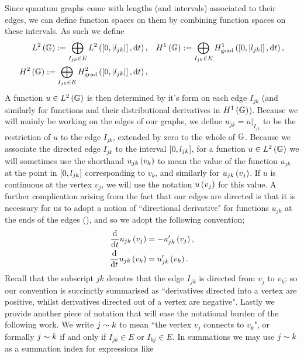 Since quantum graphs come with lengths (and intervals) associated to their edges, we can define function spaces on them by combining function spaces on these intervals.
As such we define
\begin{subequations} \label{eq:GraphFuncSpaces}
	\begin{align}
		L^2\left( \mathbb{G} \right) := \bigoplus_{I_{jk}\in E} L^{2}\left( \left[ 0,\left\lvert l_{jk} \right\rvert \right],\mathrm{d}t \right),
		&\quad H^1\left( \mathbb{G} \right) := \bigoplus_{I_{jk}\in E} H^1_\mathrm{grad}\left( \left[ 0,\left\lvert l_{jk} \right\rvert \right], \mathrm{d}t \right), \\
		H^2\left( \mathbb{G} \right) := \bigoplus_{I_{jk}\in E} H^2_\mathrm{grad}\left( \left[ 0,\left\lvert l_{jk} \right\rvert \right], \mathrm{d} t \right), &
	\end{align}
\end{subequations}
A function $u\in L^2\left( \mathbb{G} \right)$ is then determined by it's form on each edge $I_{jk}$ (and similarly for functions and their distributional derivatives in $H^1\left( \mathbb{G} \right)$).
Because we will mainly be working on the edges of our graphs, we define $u_{jk} = u\vert_{I_{jk}}$ to be the restriction of $u$ to the edge $I_{jk}$, extended by zero to the whole of $\mathbb{G}$.
Because we associate the directed edge $I_{jk}$ to the interval $\left[ 0,l_{jk} \right]$, for a function $u\in L^2\left( \mathbb{G} \right)$ we will sometimes use the shorthand $u_{jk}\left( v_k \right)$ to mean the value of the function $u_{jk}$ at the point in $\left[ 0,l_{jk} \right]$ corresponding to $v_k$, and similarly for $u_{jk}\left( v_j \right)$.
If $u$ is continuous at the vertex $v_j$, we will use the notation $u\left( v_j \right)$ for this value.
A further complication arising from the fact that our edges are directed is that it is necessary for us to adopt a notion of ``directional derivative" for functions $u_{jk}$ at the ends of the edges (), and so we adopt the following convention;  
\begin{align*}
	\dfrac{\mathrm{d}}{\mathrm{d}t}u_{jk}\left( v_j \right) &= -u'_{jk}\left( v_j \right), \\
	\dfrac{\mathrm{d}}{\mathrm{d}t}u_{jk}\left( v_k \right) &= u'_{jk}\left( v_k \right).
\end{align*}
Recall that the subscript $jk$ denotes that the edge $I_{jk}$ is directed from $v_j$ to $v_k$; so our convention is succinctly summarised as ``derivatives directed into a vertex are positive, whilst derivatives directed out of a vertex are negative". 
Lastly we provide another piece of notation that will ease the notational burden of the following work.
We write $j\sim k$ to mean ``the vertex $v_j$ connects to $v_k$", or formally $j\sim k$ if and only if $I_{jk}\in E$ or $I_{kj}\in E$.
In summations we may use $j\sim k$ as a summation index for expressions like
